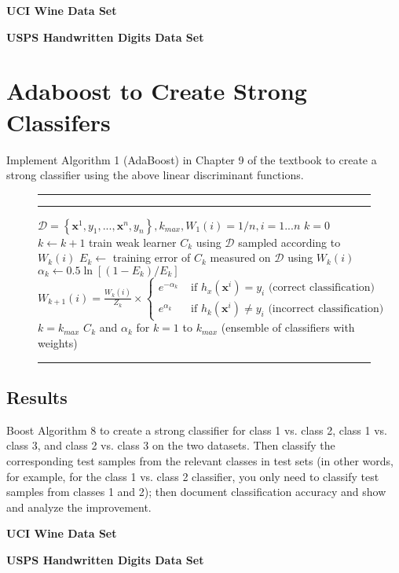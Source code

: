 \documentclass{article}
\newcommand{\mbrace}[1]{\ensuremath{\left\{#1\right\}}}
\newcommand{\mbf}[1]{\ensuremath{\mathbf{#1}}}
\newcommand{\mc}[1]{\ensuremath{\mathcal{#1}}}
\newcommand{\algtab}{\hspace{\algorithmicindent}}
\newcommand{\algtitle}[1]{\smallskip\hrule\smallskip{\bf #1}\smallskip\hrule}
\newenvironment{algo}[1]
{\noindent\ignorespaces\algtitle{#1}\begin{algorithmic}[1]}
{\end{algorithmic}\hrule\smallskip\ignorespacesafterend}
\newcommand{\fakesection}[1]{{\bf #1}\par}
\begin{document}
\bigskip
\fakesection{UCI Wine Data Set}
\bigskip
\fakesection{USPS Handwritten Digits Data Set}


\section{Adaboost to Create Strong Classifers}
Implement Algorithm 1 (AdaBoost) in Chapter 9 of the textbook to create a strong classifier using the above linear discriminant functions.

\begin{figure}[H]
\begin{algo}{Algorithm 9.1 (AdaBoost)}
\newcommand{\mbx}{\mbf{x}}
 $\mc{D} = \mbrace{\mbx^1, y_1, ..., \mbx^n, y_n}, k_{max}, W_1(i) = 1/n, i = 1...n$
\State $k = 0$
 ~$k \gets k+1$
\State\algtab train weak learner $C_k$ using \mc{D} sampled according to $W_k(i)$
\State\algtab $E_k \gets$ training error of $C_k$ measured on \mc{D} using $W_k(i)$
\State\algtab $\alpha_k \gets 0.5 \ln\left[ (1-E_k) / E_k \right]$
\State\algtab $W_{k+1}(i) = \frac{W_k(i)}{Z_k} \times \begin{cases}
e^{-\alpha_k} & \text{ if } h_x(\mbx^i) = y_i \text{ (correct classification)}\\
e^{\alpha_k} & \text{ if } h_k(\mbx^i) \neq y_i \text{ (incorrect classification)}
\end{cases}$
 $k = k_{max}$
 $C_k$ and $\alpha_k$ for $k = 1$ to $k_{max}$ (ensemble of classifiers with weights)
\end{algo}
\end{figure}

\subsection*{Results}
Boost Algorithm 8 to create a strong classifier for class 1 vs. class 2, class 1 vs. class 3, and class 2 vs. class 3 on the two datasets. Then classify the corresponding test samples from the relevant classes in test sets (in other words, for example, for the class 1 vs. class 2 classifier, you only need to classify test samples from classes 1 and 2); then document classification accuracy and show and analyze the improvement.

\bigskip

\fakesection{UCI Wine Data Set}
\bigskip
\fakesection{USPS Handwritten Digits Data Set}
\end{document}
